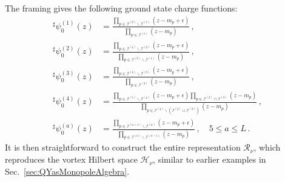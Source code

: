 \documentclass[12pt,a4paper]{article}
\renewcommand{\(}{\left(}
\renewcommand{\)}{\right)}
\renewcommand{\(}{\left(}
\renewcommand{\)}{\right)}
\begin{document}
The framing gives the following ground state charge functions:
\begin{align}
^\sharp\psi^{(1)}_0(z)&=\frac{\prod_{p\in\mathcal{I}^{(2)}\backslash\mathcal{I}^{(1)}}(z-m_p+\epsilon)}{\prod_{p\in\mathcal{I}^{(1)}}(z-m_p)}\,,\\
^\sharp\psi^{(2)}_0(z)&=\frac{\prod_{p\in \mathcal{I}^{(4)}\backslash\mathcal{I}^{(2)}}(z-m_p+\epsilon)}{\prod_{p\in \mathcal{I}^{(2)}\backslash\mathcal{I}^{(1)}}(z-m_p)}\,,\\
^\sharp\psi^{(3)}_0(z)&=\frac{\prod_{p\in\mathcal{I}^{(4)}\backslash\mathcal{I}^{(3)}}(z-m_p+\epsilon)}{\prod_{p\in\mathcal{I}^{(3)}}(z-m_p)}\,,\\
^\sharp\psi^{(4)}_0(z)&=\frac{\prod_{p\in\mathcal{I}^{(5)}\backslash\mathcal{I}^{(4)}}(z-m_p+\epsilon)\prod_{p\in \mathcal{I}^{(2)}\cap \mathcal{I}^{(3)}}(z-m_p)}{\prod_{p\in \mathcal{I}^{(4)}\backslash(\mathcal{I}^{(2)}\cup \mathcal{I}^{(3)})}(z-m_p)}\,,\\
^\sharp\psi^{(a)}_0(z)&=\frac{\prod_{p\in\mathcal{I}^{(a+1)}\backslash\mathcal{I}^{(a)}}(z-m_p+\epsilon)}{\prod_{p\in \mathcal{I}^{(a)}\backslash\mathcal{I}^{(a-1)}}(z-m_p)}\,,\quad 5\leq a\leq L\,.
\end{align}
It is then straightforward to construct the entire representation $\mathcal{R}_\nu$, which reproduces the vortex Hilbert space $\mathcal{H}_\nu$, similar to earlier examples in Sec.~\ref{sec:QYasMonopoleAlgebra}.
\end{document}
